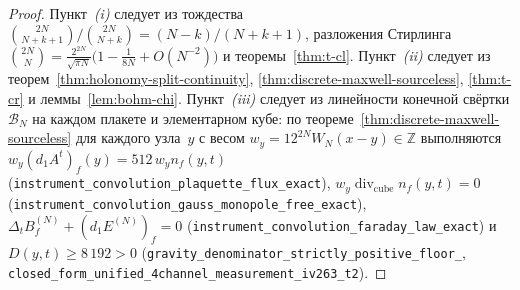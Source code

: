 \begin{proof}
Пункт~\emph{(i)} следует из тождества $\binom{2N}{N+k+1}/\binom{2N}{N+k} = (N-k)/(N+k+1)$, разложения Стирлинга $\binom{2N}{N} = \frac{2^{2N}}{\sqrt{\pi N}}\bigl(1 - \frac{1}{8N} + O(N^{-2})\bigr)$ и теоремы~\ref{thm:t-cl}.
Пункт~\emph{(ii)} следует из теорем~\ref{thm:holonomy-split-continuity}, \ref{thm:discrete-maxwell-sourceless}, \ref{thm:t-cr} и леммы~\ref{lem:bohm-chi}.
Пункт~\emph{(iii)} следует из линейности конечной свёртки $\mathcal{B}_N$ на каждом плакете и элементарном кубе: по теореме~\ref{thm:discrete-maxwell-sourceless} для каждого узла~$y$ с весом $w_y = 12^{2N}W_N(x-y)\in\mathbb{Z}$ выполняются $w_y(d_1 A^t)_f(y) = 512\,w_y n_f(y,t)$ (\texttt{instrument\_\allowbreak convolution\_\allowbreak plaquette\_\allowbreak flux\_\allowbreak exact}), $w_y\operatorname{div}_{\mathrm{cube}} n_f(y,t) = 0$ (\texttt{instrument\_\allowbreak convolution\_\allowbreak gauss\_\allowbreak monopole\_\allowbreak free\_\allowbreak exact}), $\Delta_t B_f^{(N)} + (d_1 E^{(N)})_f = 0$ (\texttt{instrument\_\allowbreak convolution\_\allowbreak faraday\_\allowbreak law\_\allowbreak exact}) и $D(y,t)\ge 8\,192 > 0$ (\texttt{gravity\_\allowbreak denominator\_\allowbreak strictly\_\allowbreak positive\_\allowbreak floor\_}, \texttt{closed\_\allowbreak form\_\allowbreak unified\_\allowbreak 4channel\_\allowbreak measurement\_\allowbreak iv263\_\allowbreak t2}).
\end{proof}

